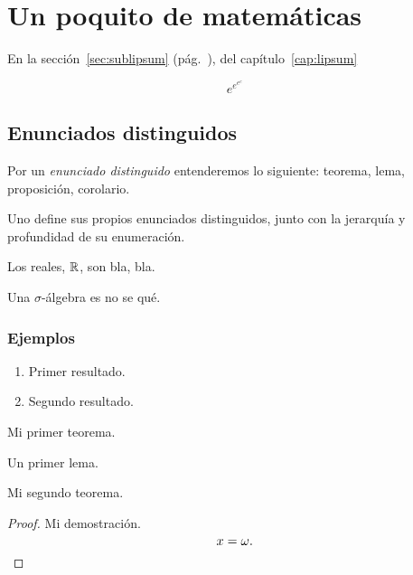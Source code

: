 \chapter{Un poquito de matemáticas}

En la sección~\ref{sec:sublipsum} (pág.~\pageref{sec:sublipsum}), del capítulo~\ref{cap:lipsum}

\begin{equation*}
  e^{e^{e^e}}
\end{equation*}

\section{Enunciados distinguidos}

Por un \emph{enunciado distinguido} entenderemos lo siguiente: teorema, lema, proposición, corolario.

Uno define sus propios enunciados distinguidos, junto con la jerarquía y profundidad de su enumeración.

Los reales, $\mathbb{R}$, son bla, bla.

Una $\sigma$-álgebra es no se qué.

\subsection{Ejemplos}

\begin{teo}
  \leavevmode
  \begin{enumerate}
    \item Primer resultado.
    \item Segundo resultado.
  \end{enumerate}
Mi primer teorema.
\end{teo}

\begin{lema}\label{lema:uno}
Un primer lema.
\end{lema}

\begin{teo}[Cauchy]
  Mi segundo teorema.
  \end{teo}
\begin{proof}
  Mi demostración.
  \begin{equation*}
    x=\omega.\qedhere
  \end{equation*}
\end{proof}

